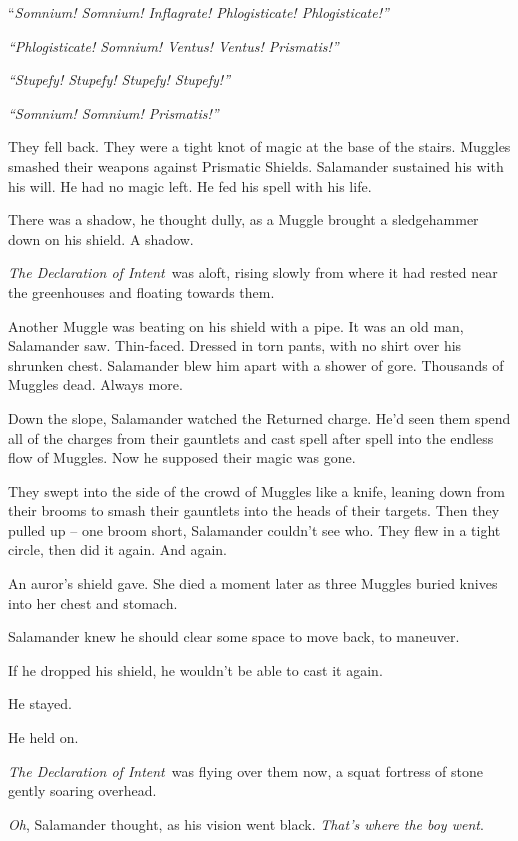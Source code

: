 ``\emph{Somnium! Somnium! Inflagrate! Phlogisticate! Phlogisticate!''}

\emph{``Phlogisticate! Somnium! Ventus! Ventus! Prismatis!''}

\emph{``Stupefy! Stupefy! Stupefy! Stupefy!''}

\emph{``Somnium! Somnium! Prismatis!''}

They fell back. They were a tight knot of magic at the base of the
stairs. Muggles smashed their weapons against Prismatic Shields.
Salamander sustained his with his will. He had no magic left. He fed his
spell with his life.

There was a shadow, he thought dully, as a Muggle brought a sledgehammer
down on his shield. A shadow.

\emph{The Declaration of Intent}~was aloft, rising slowly from where it
had rested near the greenhouses and floating towards them.

Another Muggle was beating on his shield with a pipe. It was an old man,
Salamander saw. Thin-faced. Dressed in torn pants, with no shirt over
his shrunken chest. Salamander blew him apart with a shower of gore.
Thousands of Muggles dead. Always more.

Down the slope, Salamander watched the Returned charge. He'd seen them
spend all of the charges from their gauntlets and cast spell after spell
into the endless flow of Muggles. Now he supposed their magic was gone.

They swept into the side of the crowd of Muggles like a knife, leaning
down from their brooms to smash their gauntlets into the heads of their
targets. Then they pulled up -- one broom short, Salamander couldn't see
who. They flew in a tight circle, then did it again. And again.

An auror's shield gave. She died a moment later as three Muggles buried
knives into her chest and stomach.

Salamander knew he should clear some space to move back, to maneuver.

If he dropped his shield, he wouldn't be able to cast it again.

He stayed.

He held on.

\emph{The Declaration of Intent}~was flying over them now, a squat
fortress of stone gently soaring overhead.

\emph{Oh}, Salamander thought, as his vision went black. \emph{That's
where the boy went}.

\mybreak


